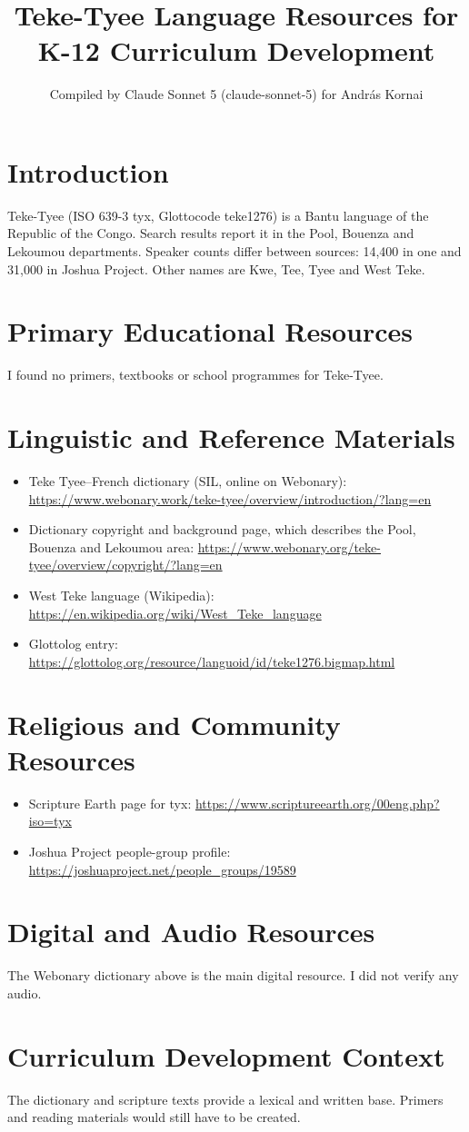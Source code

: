 \documentclass[12pt]{article}
\title{Teke-Tyee Language Resources for K-12 Curriculum Development}
\author{Compiled by Claude Sonnet 5 (claude-sonnet-5) for Andr\'as Kornai}
\date{}
\begin{document}
\maketitle

\section{Introduction}
Teke-Tyee (ISO 639-3 tyx, Glottocode teke1276) is a Bantu language of the Republic of the Congo. Search results report it in the Pool, Bouenza and Lekoumou departments. Speaker counts differ between sources: 14,400 in one and 31,000 in Joshua Project. Other names are Kwe, Tee, Tyee and West Teke.

\section{Primary Educational Resources}
I found no primers, textbooks or school programmes for Teke-Tyee.

\section{Linguistic and Reference Materials}
\begin{itemize}
\item Teke Tyee--French dictionary (SIL, online on Webonary): \url{https://www.webonary.work/teke-tyee/overview/introduction/?lang=en}
\item Dictionary copyright and background page, which describes the Pool, Bouenza and Lekoumou area: \url{https://www.webonary.org/teke-tyee/overview/copyright/?lang=en}
\item West Teke language (Wikipedia): \url{https://en.wikipedia.org/wiki/West_Teke_language}
\item Glottolog entry: \url{https://glottolog.org/resource/languoid/id/teke1276.bigmap.html}
\end{itemize}

\section{Religious and Community Resources}
\begin{itemize}
\item Scripture Earth page for tyx: \url{https://www.scriptureearth.org/00eng.php?iso=tyx}
\item Joshua Project people-group profile: \url{https://joshuaproject.net/people_groups/19589}
\end{itemize}

\section{Digital and Audio Resources}
The Webonary dictionary above is the main digital resource. I did not verify any audio.

\section{Curriculum Development Context}
The dictionary and scripture texts provide a lexical and written base. Primers and reading materials would still have to be created.
\end{document}
